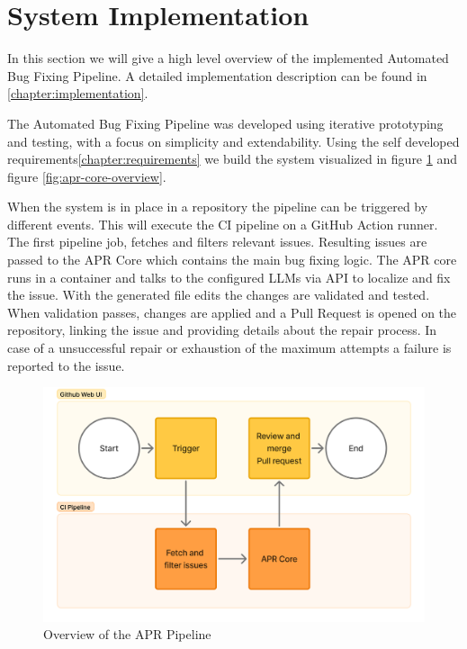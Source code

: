 \section{System Implementation}

In this section we will give a high level overview of the implemented Automated Bug Fixing Pipeline. A detailed implementation description can be found in \ref{chapter:implementation}.

The Automated Bug Fixing Pipeline was developed using iterative prototyping and testing, with a focus on simplicity and extendability. Using the self developed requirements\ref{chapter:requirements} we build the system visualized in figure \ref{fig:high-level} and figure \ref{fig:apr-core-overview}. 

When the system is in place in a repository the pipeline can be triggered by different events. This will execute the CI pipeline on a GitHub Action runner. The first pipeline job, fetches and filters relevant issues. Resulting issues are passed to the APR Core which contains the main bug fixing logic. The APR core runs in a container and talks to the configured LLMs via API to localize and fix the issue. With the generated file edits the changes are validated and tested. When validation passes, changes are applied and a Pull Request is opened on the repository, linking the issue and providing details about the repair process. In case of a unsuccessful repair or exhaustion of the maximum attempts a failure is reported to the issue.

\begin{figure}[H]
    \centering
    \includegraphics[width=1\textwidth]{images/flowcharts/overview.png}
    \caption{Overview of the APR Pipeline}
    \label{fig:high-level}
\end{figure}


